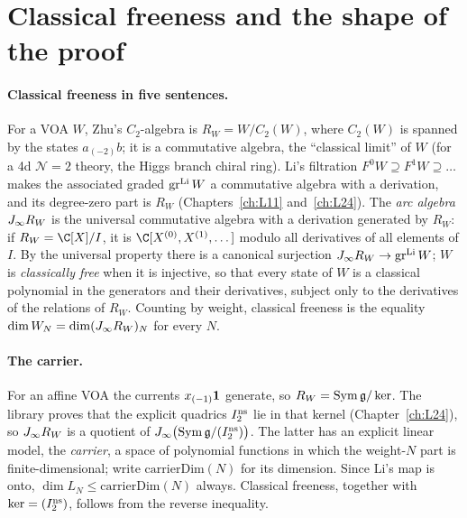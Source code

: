 \section{Classical freeness and the shape of the proof}\label{l27:sec:chain}

\paragraph{Classical freeness in five sentences.} For a VOA $W$, Zhu's $C_2$-algebra is $R_W=W/C_2(W)$, where $C_2(W)$
is spanned by the states $a_{(-2)}b$; it is a commutative algebra, the ``classical limit'' of $W$ (for a 4d
$\mathcal N=2$ theory, the Higgs branch chiral ring). Li's filtration $F^0W\supseteq F^1W\supseteq\dots$ makes the
associated graded $\operatorname{gr}^{\mathrm{Li}}W$ a commutative algebra with a derivation, and its degree-zero part is
$R_W$ (Chapters~\ref{ch:L11} and~\ref{ch:L24}). The \emph{arc algebra} $J_\infty R_W$ is the universal commutative
algebra with a derivation generated by $R_W$: if $R_W=\C[X]/I$, it is $\C[X^{(0)},X^{(1)},\dots]$ modulo all derivatives of
all elements of $I$. By the universal property there is a canonical surjection $J_\infty R_W\to\operatorname{gr}^{\mathrm{Li}}W$;
$W$ is \emph{classically free} when it is injective, so that every state of $W$ is a classical polynomial in the generators
and their derivatives, subject only to the derivatives of the relations of $R_W$. Counting by weight, classical freeness is
the equality $\dim W_N=\dim(J_\infty R_W)_N$ for every $N$.

\paragraph{The carrier.} For an affine VOA the currents $x_{(-1)}\mathbf 1$ generate, so
$R_W=\operatorname{Sym}\mathfrak g/\ker$. The library proves that the explicit quadrics $I_2^{\mathrm{ns}}$ lie in that
kernel (Chapter~\ref{ch:L24}), so $J_\infty R_W$ is a quotient of
$J_\infty\bigl(\operatorname{Sym}\mathfrak g/(I_2^{\mathrm{ns}})\bigr)$. The latter has an explicit linear model, the
\emph{carrier}, a space of polynomial functions in which the weight-$N$ part is finite-dimensional; write
$\mathrm{carrierDim}(N)$ for its dimension. Since Li's map is onto, $\dim L_N\le\mathrm{carrierDim}(N)$ always. Classical
freeness, together with $\ker=(I_2^{\mathrm{ns}})$, follows from the reverse inequality.

